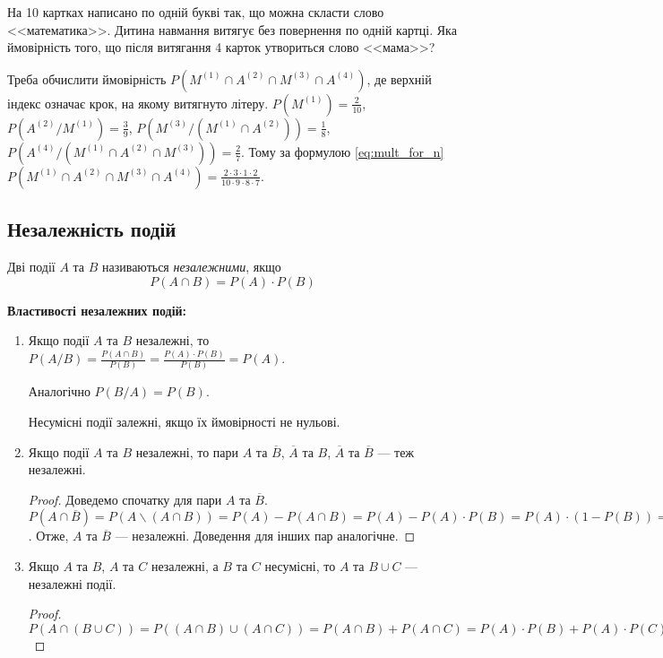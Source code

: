 \begin{example}
    На 10 картках написано по одній букві так, що можна скласти слово <<математика>>.
    Дитина навмання витягує без повернення по одній картці. Яка ймовірність того, що після витягання 4 карток
    утвориться слово <<мама>>?

    Треба обчислити ймовірність $P(M^{(1)} \cap A^{(2)} \cap M^{(3)} \cap A^{(4)})$,
    де верхній індекс означає крок, на якому витягнуто літеру.
    $P(M^{(1)}) = \frac{2}{10}$, $P(A^{(2)} / M^{(1)}) = \frac{3}{9}$,
    $P(M^{(3)}/(M^{(1)} \cap A^{(2)})) = \frac{1}{8}$, $P(A^{(4)} / (M^{(1)} \cap A^{(2)} \cap M^{(3)})) = \frac{2}{7}$.
    Тому за формулою \eqref{eq:mult_for_n} $P(M^{(1)} \cap A^{(2)} \cap M^{(3)} \cap A^{(4)}) = \frac{2 \cdot 3 \cdot 1 \cdot 2}{10 \cdot 9 \cdot 8 \cdot 7}$.
\end{example}

\subsection{Незалежність подій}
\begin{definition}
    Дві події $A$ та $B$ називаються \emph{незалежними}, якщо
    \begin{equation}
        P(A\cap B) = P(A)\cdot P(B)
    \end{equation}
\end{definition}
\noindent \textbf{Властивості незалежних подій:}
\begin{enumerate}
    \item Якщо події $A$ та $B$ незалежні, то $P(A/B) = \frac{P(A\cap B)}{P(B)} = \frac{P(A)\cdot P(B)}{P(B)} = P(A)$.
    
    Аналогічно $P(B/A) = P(B)$.
    \begin{remark}
        Несумісні події залежні, якщо їх ймовірності не нульові.
    \end{remark}

    \item Якщо події $A$ та $B$ незалежні, то пари $A$ та $\overline{B}$, 
    $\overline{A}$ та $B$, $\overline{A}$ та $\overline{B}$ --- теж незалежні.
    \begin{proof}
        Доведемо спочатку для пари $A$ та $\overline{B}$. $P(A\cap \overline{B}) = P(A\backslash (A\cap B)) = P(A) - P(A\cap B) = P(A) - P(A)\cdot P(B) = P(A)\cdot (1 - P(B)) = P(A)\cdot P(\overline{B})$.
        Отже, $A$ та $\overline{B}$ --- незалежні. Доведення для інших пар аналогічне.
    \end{proof}
    \item Якщо $A$ та $B$, $A$ та $C$ незалежні, а $B$ та $C$ несумісні, то $A$ та $B\cup C$ --- незалежні події.
    \begin{proof}
        $P(A\cap (B \cup C)) = P((A \cap B) \cup (A \cap C)) = P(A\cap B) + P(A\cap C) = P(A)\cdot P(B) + P(A)\cdot P(C) = P(A) \cdot (P(B) + P(C)) = P(A)\cdot P(B\cup C).$
    \end{proof}
\end{enumerate}

